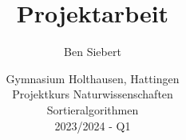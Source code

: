 \documentclass[./entry.tex]{subfiles}
\begin{document}
    \title{Projektarbeit}
    \author{Ben Siebert}
    \date{{
        Gymnasium Holthausen, Hattingen \\
        Projektkurs Naturwissenschaften \\
        Sortieralgorithmen \\
        2023/2024 - Q1
    }}
    \maketitle

    \thispagestyle{empty}
\end{document}

